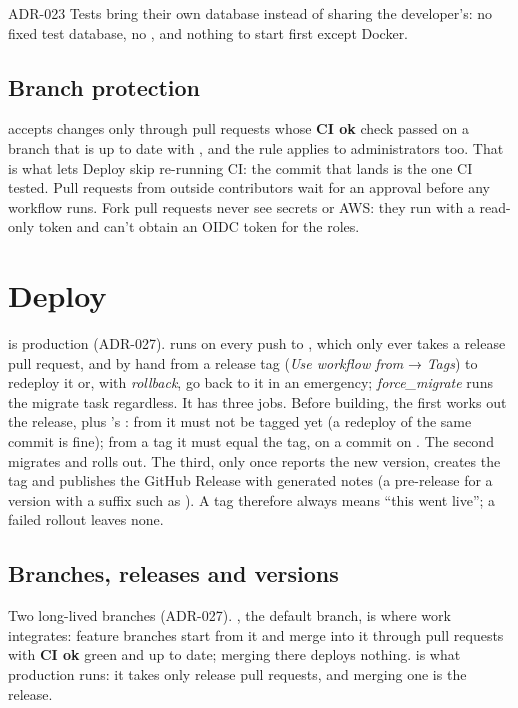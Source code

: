 \begin{decision}{ADR-023}
  Tests bring their own database instead of sharing the developer's: no fixed test database, no
  , and nothing to start first except Docker.
\end{decision}

\subsection{Branch protection}
 accepts changes only through pull requests whose \textbf{CI ok} check passed on a
branch that is up to date with , and the rule applies to administrators too. That is
what lets Deploy skip re-running CI: the commit that lands is the one CI tested. Pull requests from
outside contributors wait for an approval before any workflow runs. Fork pull requests never see
secrets or AWS: they run with a read-only token and can't obtain an OIDC token for the roles.

\section{Deploy}\label{sec:deploy}
 is production (ADR-027).  runs on every push to
, which only ever takes a release pull request, and by hand from a release tag
(\emph{Use workflow from} → \emph{Tags}) to redeploy it or, with \emph{rollback}, go back to it in
an emergency; \emph{force\_migrate} runs the migrate task regardless. It has three jobs. Before
building, the first works out the release,  plus 's : from
 it must not be tagged yet (a redeploy of the same commit is fine); from a tag it
must equal the tag, on a commit on . The second migrates and rolls out. The third,
only once  reports the new version, creates the tag and publishes the GitHub
Release with generated notes (a pre-release for a version with a suffix such as
). A tag therefore always means ``this went live''; a failed rollout leaves none.

\subsection{Branches, releases and versions}\label{sec:releases}
Two long-lived branches (ADR-027). , the default branch, is where work integrates:
feature branches start from it and merge into it through pull requests with \textbf{CI ok} green
and up to date; merging there deploys nothing.  is what production runs: it takes
only release pull requests, and merging one is the release.

